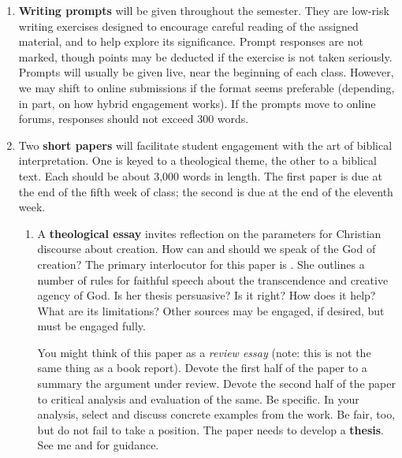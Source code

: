 \documentclass[titlepage]{article}
\begin{document}
\begin{enumerate}

	\item \textbf{Writing prompts} will be given throughout the
	semester. They are low-risk writing exercises designed to encourage
	careful reading of the assigned material, and to help explore its
	significance. Prompt responses are not marked, though points may be
	deducted if the exercise is not taken seriously. Prompts will
	usually be given live, near the beginning of each class. However, we
	may shift to online submissions if the format seems preferable
	(depending, in part, on how hybrid engagement works). If the prompts
	move to online forums, responses should not exceed 300 words.

	\item Two \textbf{short papers} will facilitate student engagement
	with the art of biblical interpretation. One is keyed to a
	theological theme, the other to a biblical text. Each should be
	about 3,000 words in length. The first paper is due at the end of
	the fifth week of class; the second is due at the end of the
	eleventh week.


	\begin{enumerate}

		\item A \textbf{theological essay} invites reflection on the
		parameters for Christian discourse about creation. How can and
		should we speak of the God of creation? The primary interlocutor
		for this paper is \cite{kt}. She outlines a number of rules for
		faithful speech about the transcendence and creative agency of
		God. Is her thesis persuasive? Is it right? How does it help?
		What are its limitations? Other sources may be engaged, if
		desired, but \cite{kt} must be engaged fully.

		You might think of this paper as a \emph{review essay} (note:
		this is not the same thing as a book report). Devote the first
		half of the paper to a summary the argument under review. Devote
		the second half of the paper to critical analysis and evaluation
		of the same. Be specific. In your analysis, select and discuss
		concrete examples from the work. Be fair, too, but do not fail
		to take a position. The paper needs to develop a
		\textbf{thesis}. See me and \cite[chs 3, 5–7, 11]{rlgs} for
		guidance.


\end{enumerate}
\end{enumerate}
\end{document}
